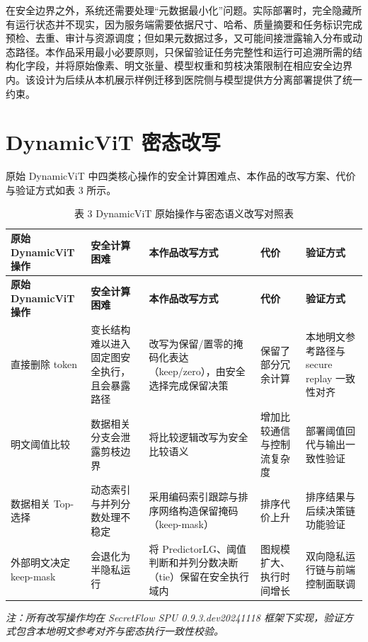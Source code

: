 在安全边界之外，系统还需要处理“元数据最小化”问题。实际部署时，完全隐藏所有运行状态并不现实，因为服务端需要依据尺寸、哈希、质量摘要和任务标识完成预检、去重、审计与资源调度；但如果元数据过多，又可能间接泄露输入分布或动态路径。本作品采用最小必要原则，只保留验证任务完整性和运行可追溯所需的结构化字段，并将原始像素、明文张量、模型权重和剪枝决策限制在相应安全边界内。该设计为后续从本机展示样例迁移到医院侧与模型提供方分离部署提供了统一约束。

\section{DynamicViT 密态改写}

原始 DynamicViT 中四类核心操作的安全计算困难点、本作品的改写方案、代价与验证方式如表 3 所示。

\begin{longtable}{>{\raggedright\arraybackslash}p{}>{\raggedright\arraybackslash}p{}>{\raggedright\arraybackslash}p{}>{\raggedright\arraybackslash}p{}>{\raggedright\arraybackslash}p{}}
\caption{表 3 DynamicViT 原始操作与密态语义改写对照表}\\
\toprule
\textbf{原始DynamicViT操作} & \textbf{安全计算困难} & \textbf{本作品改写方式} & \textbf{代价} & \textbf{验证方式} \\
\midrule
\endfirsthead
\toprule
\textbf{原始DynamicViT操作} & \textbf{安全计算困难} & \textbf{本作品改写方式} & \textbf{代价} & \textbf{验证方式} \\
\midrule
\endhead
直接删除 token & 变长结构难以进入固定图安全执行，且会暴露路径 & 改写为保留/置零的掩码化表达（keep/zero），由安全选择完成保留决策 & 保留了部分冗余计算 & 本地明文参考路径与 secure replay 一致性对齐 \\
明文阈值比较 & 数据相关分支会泄露剪枝边界 & 将比较逻辑改写为安全比较语义 & 增加比较通信与控制流复杂度 & 部署阈值回代与输出一致性验证 \\
数据相关 Top-选择 & 动态索引与并列分数处理不稳定 & 采用编码索引跟踪与排序网络构造保留掩码（keep-mask） & 排序代价上升 & 排序结果与后续决策链功能验证 \\
外部明文决定 keep-mask & 会退化为半隐私运行 & 将 PredictorLG、阈值判断和并列分数决断（tie）保留在安全执行域内 & 图规模扩大、执行时间增长 & 双向隐私运行链与前端控制面联调 \\
\bottomrule
\end{longtable}

\noindent\textit{注：所有改写操作均在 SecretFlow SPU 0.9.3.dev20241118 框架下实现，验证方式包含本地明文参考对齐与密态执行一致性校验。}


